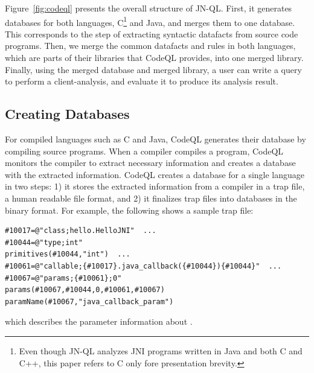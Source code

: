 Figure~\ref{fig:codeql} presents the overall structure of JN-QL.
First, it generates databases for both languages, C\footnote{
Even though JN-QL analyzes JNI programs written in Java and both C and
C++, this paper refers to C only fore presentation brevity.} and
Java, and merges them to one database.  This corresponds
to the step of extracting syntactic datafacts from source code programs.
Then, we merge the common datafacts and rules in both languages,
which are parts of their libraries that CodeQL provides, into one merged library.
Finally, using the merged database and merged library, a user can write a query to
perform a client-analysis, and evaluate it to produce its analysis result.

\subsection{Creating Databases}
For compiled languages such as C and Java, CodeQL generates their database
by compiling source programs.  When a compiler compiles a program,
CodeQL monitors the compiler to extract necessary information and
creates a database with the extracted information.
CodeQL creates a database for a single language in two steps:
1) it stores the extracted information from a compiler in a trap
file, a human readable file format, and 2) it finalizes trap files
into databases in the binary format. For example, the
following shows a sample trap file:

\begin{lstlisting}[style=java,numbers=none]
#10017=@"class;hello.HelloJNI"  ...
#10044=@"type;int"
primitives(#10044,"int")  ...
#10061=@"callable;{#10017}.java_callback({#10044}){#10044}"  ...
#10067=@"params;{#10061};0"
params(#10067,#10044,0,#10061,#10067)
paramName(#10067,"java_callback_param")
\end{lstlisting}
which describes the parameter information about .

